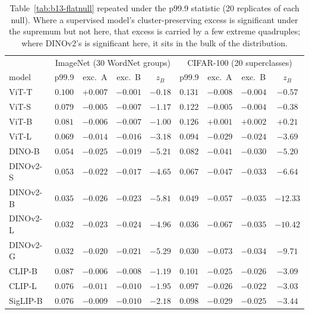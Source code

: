 \begin{table}[H]
\centering
\small
\setlength{\tabcolsep}{4pt}
\begin{tabular}{lcccc|cccc}
\toprule
& \multicolumn{4}{c|}{ImageNet (30 WordNet groups)} & \multicolumn{4}{c}{CIFAR-100 (20 superclasses)} \\
model & p99.9 & exc.\ A & exc.\ B & $z_B$ & p99.9 & exc.\ A & exc.\ B & $z_B$ \\
\midrule
ViT-T & $0.100$ & $+0.007$ & $-0.001$ & $-0.18$ & $0.131$ & $-0.008$ & $-0.004$ & $-0.57$ \\
ViT-S & $0.079$ & $-0.005$ & $-0.007$ & $-1.17$ & $0.122$ & $-0.005$ & $-0.004$ & $-0.38$ \\
ViT-B & $0.081$ & $-0.006$ & $-0.007$ & $-1.00$ & $0.126$ & $+0.001$ & $+0.002$ & $+0.21$ \\
ViT-L & $0.069$ & $-0.014$ & $-0.016$ & $-3.18$ & $0.094$ & $-0.029$ & $-0.024$ & $-3.69$ \\
\midrule
DINO-B & $0.054$ & $-0.025$ & $-0.019$ & $-5.21$ & $0.082$ & $-0.041$ & $-0.030$ & $-5.20$ \\
DINOv2-S & $0.053$ & $-0.022$ & $-0.017$ & $-4.65$ & $0.067$ & $-0.047$ & $-0.033$ & $-6.64$ \\
DINOv2-B & $0.035$ & $-0.026$ & $-0.023$ & $-5.81$ & $0.049$ & $-0.057$ & $-0.035$ & $-12.33$ \\
DINOv2-L & $0.032$ & $-0.023$ & $-0.024$ & $-4.96$ & $0.036$ & $-0.067$ & $-0.035$ & $-10.42$ \\
DINOv2-G & $0.032$ & $-0.020$ & $-0.021$ & $-5.29$ & $0.030$ & $-0.073$ & $-0.034$ & $-9.71$ \\
\midrule
CLIP-B & $0.087$ & $-0.006$ & $-0.008$ & $-1.19$ & $0.101$ & $-0.025$ & $-0.026$ & $-3.09$ \\
CLIP-L & $0.076$ & $-0.011$ & $-0.010$ & $-1.95$ & $0.097$ & $-0.026$ & $-0.022$ & $-3.03$ \\
SigLIP-B & $0.076$ & $-0.009$ & $-0.010$ & $-2.18$ & $0.098$ & $-0.029$ & $-0.025$ & $-3.44$ \\
\bottomrule
\end{tabular}
\caption{Table~\ref{tab:b13-flatnull} repeated under the p99.9 statistic (20 replicates of each null). Where a supervised model's cluster-preserving excess is significant under the supremum but not here, that excess is carried by a few extreme quadruples; where DINOv2's is significant here, it sits in the bulk of the distribution.}
\label{tab:b22-flatnull-p999}
\end{table}
